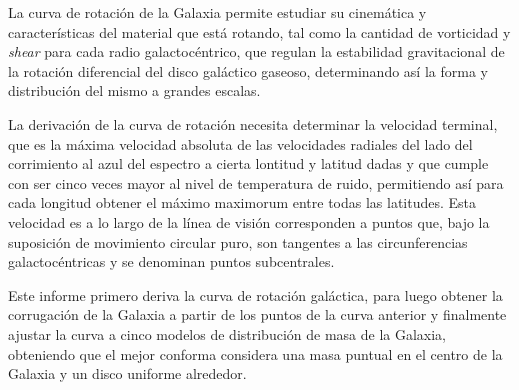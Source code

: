 La curva de rotación de la Galaxia permite estudiar su cinemática y características del material que está rotando, tal como la cantidad de vorticidad y \textit{shear} para cada radio galactocéntrico, que regulan la estabilidad gravitacional de la rotación diferencial del disco galáctico gaseoso, determinando así la forma y distribución del mismo a grandes escalas.

La derivación de la curva de rotación necesita determinar la velocidad terminal, que es la máxima velocidad absoluta de las velocidades radiales del lado del corrimiento al azul del espectro a cierta lontitud y latitud dadas y que cumple con ser cinco veces mayor al nivel de temperatura de ruido, permitiendo así para cada longitud obtener el máximo maximorum entre todas las latitudes. Esta velocidad es a lo largo de la línea de visión corresponden a puntos que, bajo la suposición de movimiento circular puro, son tangentes a las circunferencias galactocéntricas y se denominan puntos subcentrales.

Este informe primero deriva la curva de rotación galáctica, para luego obtener la corrugación de la Galaxia a partir de los puntos de la curva anterior y finalmente ajustar la curva a cinco modelos de distribución de masa de la Galaxia, obteniendo que el mejor conforma considera una masa puntual en el centro de la Galaxia y un disco uniforme alrededor.
